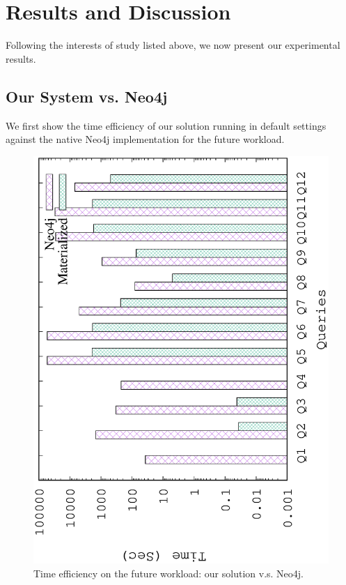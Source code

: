 
\section{Results and Discussion}
\label{Results and Discussion}
Following the interests of study listed above, we now present our experimental results.

\subsection{Our System vs. Neo4j}
\label{Our System vs. Neo4j}
We first show the time efficiency of our solution running in default settings against the native Neo4j implementation for the future workload.


\begin{figure}[H]
	\centering
	\includegraphics[scale=0.5, angle=270]{plot/neo4j.eps}
	\caption{Time efficiency on the future workload: our solution v.s. Neo4j.}
	\label{fig:neo4j}
\end{figure}

